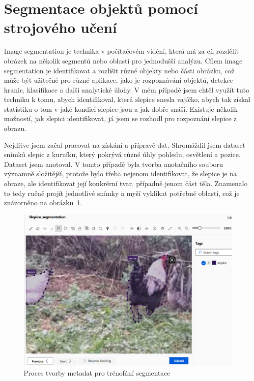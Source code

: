 \section{Segmentace objektů pomocí strojového učení}\label{sec:klasifikace-a-segmentace-objektu-pomoci-strojoveho-uceni}

Image segmentation je technika v počítačovém vidění, která má za cíl rozdělit obrázek na několik segmentů nebo oblastí pro jednodušší analýzu.
Cílem image segmentation je identifikovat a rozlišit různé objekty nebo části obrázku, což může být užitečné pro různé aplikace, jako je rozpoznávání objektů, detekce hranic, klasifikace a další analytické úlohy.
V mém případě jsem chtěl využít tuto techniku k tomu, abych identifikoval, která slepice snesla vajíčko, abych tak získal statistiku o tom v jaké kondici slepice jsou a jak dobře snáší.
Existuje několik možností, jak slepici identifikovat, já jsem se rozhodl pro rozpoznání slepice z obrazu.

Nejdříve jsem začal pracovat na získání a přípravě dat.
Shromáždil jsem dataset snímků slepic z kurníku, který pokrývá různé úhly pohledu, osvětlení a pozice.
Dataset jsem anotoval.
V tomto případě byla tvorba anotačního souboru významně složitější, protože bylo třeba nejenom identifikovat, že slepice je na obraze, ale identifikovat její konkrérní tvar, případně jenom část těla.
Znamenalo to tedy ručně projít jednotlivé snímky a myší vyklikat potřebné oblasti, což je znázorněno na obrázku~\ref{fig:label_segmentation}.

\begin{figure}[h]
    \centering
    \includegraphics[width=\textwidth]{img/label_segmentation}
    \caption{Proces tvorby metadat pro trénofání segmentace}
    \label{fig:label_segmentation}
\end{figure}

